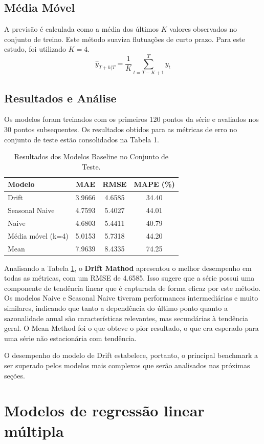 \documentclass{article}
\begin{document}
\subsection{Média Móvel}
A previsão é calculada como a média dos últimos $K$ valores observados no conjunto de treino. Este método suaviza flutuações de curto prazo. Para este estudo, foi utilizado $K=4$.
$$ \hat{y}_{T+h|T} = \frac{1}{K}\sum_{t=T-K+1}^{T}y_t $$

\subsection{Resultados e Análise}
Os modelos foram treinados com os primeiros 120 pontos da série e avaliados nos 30 pontos subsequentes. Os resultados obtidos para as métricas de erro no conjunto de teste estão consolidados na Tabela 1.

\begin{table}[h]
    \centering
    \begin{tabular}{|l|c|c|c|}
        \hline
        \textbf{Modelo} & \textbf{MAE} & \textbf{RMSE} & \textbf{MAPE (\%)} \\
        \hline
        Drift & 3.9666 & 4.6585 & 34.40 \\
        Seasonal Naive & 4.7593 & 5.4027 & 44.01 \\
        Naive & 4.6803 & 5.4411 & 40.79 \\
        Média móvel (k=4) & 5.0153 & 5.7318 & 44.20 \\
        Mean & 7.9639 & 8.4335 & 74.25 \\
        \hline
    \end{tabular}
    \caption{Resultados dos Modelos Baseline no Conjunto de Teste.}
    \label{tab:baseline_results}
\end{table}

Analisando a Tabela \ref{tab:baseline_results}, o \textbf{Drift Mathod} apresentou o melhor desempenho em todas as métricas, com um RMSE de 4.6585. Isso sugere que a série possui uma componente de tendência linear que é capturada de forma eficaz por este método. Os modelos Naive e Seasonal Naive tiveram performances intermediárias e muito similares, indicando que tanto a dependência do último ponto quanto a sazonalidade anual são características relevantes, mas secundárias à tendência geral. O Mean Method foi o que obteve o pior resultado, o que era esperado para uma série não estacionária com tendência.

O desempenho do modelo de Drift estabelece, portanto, o principal benchmark a ser superado pelos modelos mais complexos que serão analisados nas próximas seções.

\section{Modelos de regressão linear múltipla}
\end{document}
